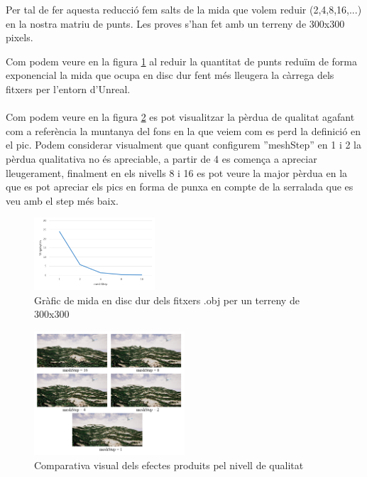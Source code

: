\documentclass[10pt,a4paper,twocolumn,twoside]{article}
\begin{document}
Per tal de fer aquesta reducció fem salts de la mida que volem reduir (2,4,8,16,...) en la nostra matriu de punts. Les proves s'han fet amb un terreny de 300x300 pixels. 

\newpage
Com podem veure en la figura \ref{fig-qualitatmegas} al reduir la quantitat de punts reduïm de forma exponencial la mida que ocupa en disc dur fent més lleugera la càrrega dels fitxers per l'entorn d'Unreal.
\\
\\
Com podem veure en la figura \ref{fig-qualityvisual} es pot visualitzar la pèrdua de qualitat agafant com a referència la muntanya del fons en la que veiem com es perd la definició en el pic. Podem considerar visualment que quant configurem ''meshStep'' en 1 i 2 la pèrdua qualitativa no és apreciable, a partir de 4 es comença a apreciar lleugerament, finalment en els nivells 8 i 16 es pot veure la major pèrdua en la que es pot apreciar els pics en forma de punxa en compte de la serralada que es veu amb el step més baix.

\begin{figure}[!h]
\centering
  	\includegraphics[width=0.4\textwidth]{qualitatmegas}
	\caption{Gràfic de mida en disc dur dels fitxers .obj per un terreny de 300x300}
	\label{fig-qualitatmegas}
\end{figure}

\begin{figure}[!h]
\centering
  	\includegraphics[width=0.5\textwidth]{quality/quality}
	\caption{Comparativa visual dels efectes produits pel nivell de qualitat}
	\label{fig-qualityvisual}
\end{figure}
\end{document}
